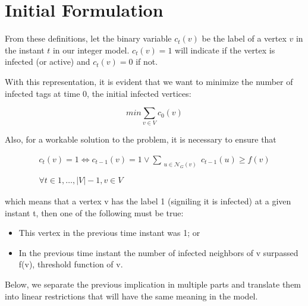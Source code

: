\section{Initial Formulation}

From these definitions, let the binary variable $ c_{t} (v) $ be the label of a vertex $ v $ in the instant $ t $ in our integer model.  $ c_{t} (v) = 1 $ will indicate if the vertex is infected (or active) and $ c_{t} (v) = 0 $ if not.

With this representation, it is evident that we want to minimize the number of infected tags at time 0, the initial infected vertices:
\begin{center}
\begin{equation}
min \sum_{v \in V} c_{0}(v)
\end{equation}
\end{center}


Also, for a workable solution to the problem, it is necessary to ensure that
\begin{center}
\begin{equation}
\begin{split} 
c_{t}(v) = 1 \iff c_{t-1}(v) = 1  \lor	 \sum_{\substack{ u \in \mathcal{N}_{G}(v) }} c_{t-1}(u) \geq f(v) \\ \\
\forall t \in 1, \ldots, |V|-1, v \in V 
\end{split}
\end{equation}
\end{center} 
which means that a vertex v has the label 1 (signiling it is infected) at a given instant t, then one of the following must be true:
\begin{itemize}
\item This vertex in the previous time instant was 1; or
\item In the previous time instant the number of infected neighbors of v surpassed f(v), threshold function of v.
\end{itemize}


Below, we separate the previous implication in multiple parts and translate them into linear restrictions that will have the same meaning in the model.

